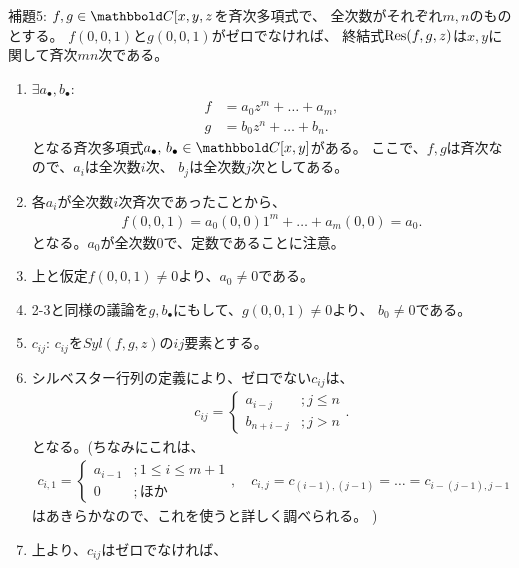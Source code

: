 \begin{framed}
  補題5:
  $f,g \in \C[x,y,z$を斉次多項式で、
  全次数がそれぞれ$m,n$のものとする。
  $f(0,0,1)$と$g(0,0,1)$がゼロでなければ、
  終結式$\mathrm{Res}(f,g,z)$は$x,y$に関して斉次$mn$次である。
\end{framed}
\begin{myproof}
  \begin{enumerate}
    \item $\exists a_\bullet,b_\bullet$:
    \begin{align}
      f&=a_0 z^m + \dots + a_m,\\
      g&= b_0 z^n + \dots + b_n.
    \end{align}
    となる斉次多項式$a_\bullet,\, b_\bullet \in \C[x,y]$がある。
    ここで、$f,g$は斉次なので、$a_i$は全次数$i$次、
    $b_j$は全次数$j$次としてある。
    \item
    各$a_i$が全次数$i$次斉次であったことから、
    \begin{align}
      f(0,0,1)
      =
      a_0(0,0)1^m + \dots + a_m(0,0)
      =
      a_0.
    \end{align}
    となる。$a_0$が全次数0で、定数であることに注意。
    \item
    上と仮定$f(0,0,1) \neq 0$より、$a_0 \neq 0$である。
    \item
    2-3と同様の議論を$g,b_\bullet$にもして、$g(0,0,1) \neq 0$より、
    $b_0 \neq 0$である。
    \item $c_{ij}$: $c_{ij}$を$Syl(f,g,z)$の$ij$要素とする。
    \item
    シルベスター行列の定義により、ゼロでない$c_{ij}$は、
    \begin{align}
      c_{ij} =
      \begin{cases}
        a_{i-j} &; j\le n\\
        b_{n+i-j} & ; j>n
      \end{cases}.
    \end{align}
    となる。(ちなみにこれは、
    \begin{align}
      c_{i,1} =
      \begin{cases}
        a_{i-1} & ; 1\le i\le m+1 \\
        0 & ; ほか
      \end{cases},\quad
      c_{i,j} = c_{(i-1),(j-1)} = \dots = c_{i-(j-1),j-1}
    \end{align}
    はあきらかなので、これを使うと詳しく調べられる。
    )
    \item
    上より、$c_{ij}$はゼロでなければ、
    \begin{align}

\end{align}
\end{enumerate}
\end{myproof}
